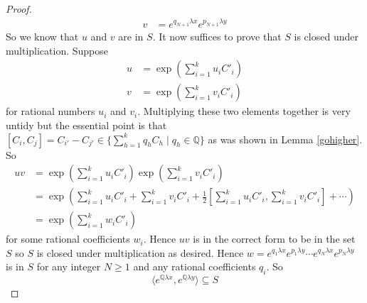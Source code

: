 \documentclass[honours]{UNSWthesis}
\newcommand{\Q}{\mathbb{Q}}
\newcommand{\1}{\mathbf{e}_{1}}
\newcommand{\2}{\mathbf{e}_{3}}
\newcommand{\3}{\mathbf{e}_{3}}
\begin{document}
\begin{proof}
\begin{align*}
v&=e^{q_{N+1}\lambda x}e^{p_{N+1}\lambda y}
\end{align*}
So we know that $u$ and $v$ are in $S$. It now suffices to prove that $S$ is closed under multiplication. Suppose 
\begin{align*}
u&=\exp \left(\sum\limits_{i=1}^{k}u_{i}C'_{i}\right)\\
v&=\exp \left(\sum\limits_{i=1}^{k}v_{i}C'_{i}\right)
\end{align*}
for rational numbers $u_{i}$ and $v_{i}$. 
\newline
Multiplying these two elements together is very untidy but the essential point is that $[C_{i},C_{j}]=C_{i'}-C_{j'} \in \{ \sum\limits_{h=1}^{k}q_{h}C_{h} \mid q_{h} \in \Q \}$ as was shown in Lemma \ref{gohigher}. So 
\begin{align*}
uv &= \exp \left(\sum\limits_{i=1}^{k}u_{i}C'_{i}\right)
\exp \left(\sum\limits_{i=1}^{k}v_{i}C'_{i}\right) \\
&= \exp \left( \sum\limits_{i=1}^{k}u_{i}C'_{i}+ \sum\limits_{i=1}^{k}v_{i}C'_{i} + \frac{1}{2}\left[\sum\limits_{i=1}^{k}u_{i}C'_{i},\sum\limits_{i=1}^{k}v_{i}C'_{i}\right] + \cdots
 \right) \\
 &= \exp \left( \sum\limits_{i=1}^{k} w_{i}C'_{i} \right)
\end{align*} 
for some rational coefficients $w_{i}$. Hence $uv$ is in the correct form to be in the set $S$ so $S$ is closed under multiplication as desired.
\newline
Hence $w=e^{q_{1}\lambda x}e^{p_{1}\lambda y} \cdots e^{q_{N}\lambda x}e^{p_{N}\lambda y} $ is in $S$ for any integer $N \geq 1$ and any rational coefficients $q_{i}$. So 
\[
\langle e^{\Q\lambda x},e^{\Q\lambda y} \rangle \subseteq S
\]

\end{proof}
\end{document}
